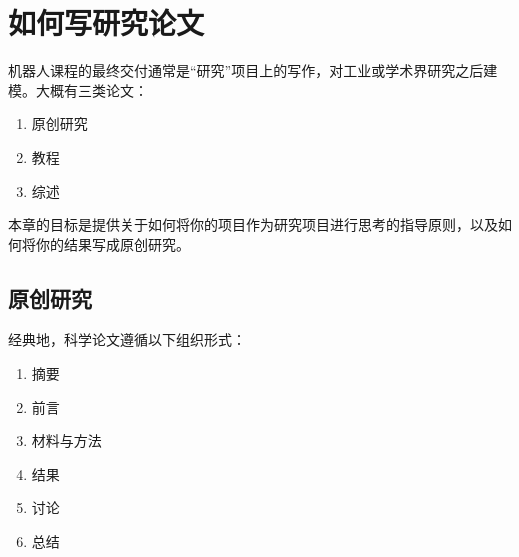 
\chapter{如何写研究论文}
机器人课程的最终交付通常是“研究”项目上的写作，对工业或学术界研究之后建模。大概有三类论文：

\begin{enumerate}

\item 原创研究
\item 教程
\item 综述
\end{enumerate}


本章的目标是提供关于如何将你的项目作为研究项目进行思考的指导原则，以及如何将你的结果写成原创研究。


\section{原创研究}
经典地，科学论文遵循以下组织形式：

\begin{enumerate}

\item 摘要
\item 前言
\item 材料与方法
\item 结果
\item 讨论
\item 总结
\end{enumerate}

